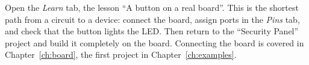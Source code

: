 \begin{buildbox}
Open the \emph{Learn} tab, the lesson ``A button on a real board''. This is the shortest
path from a circuit to a device: connect the board, assign ports
in the \emph{Pins} tab, and check that the button lights the LED. Then
return to the ``Security Panel'' project and build it completely on the board.
Connecting the board is covered in Chapter~\ref{ch:board}, the first project in
Chapter~\ref{ch:examples}.
\end{buildbox}
